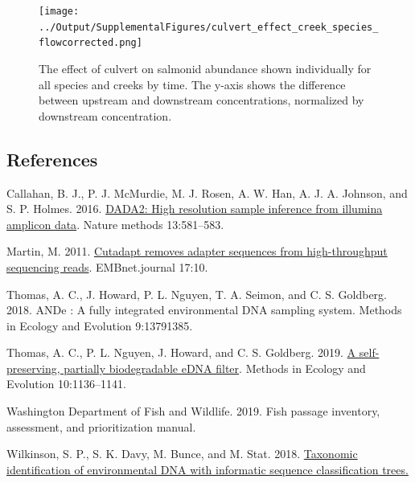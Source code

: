 \documentclass[
]{article}
\newlength{\cslhangindent}
\newlength{\cslentryspacingunit} %
\newenvironment{CSLReferences}[2] %
 {%
  \setlength{\parindent}{0pt}
  \ifodd #1
  \let\oldpar\par
  \def\par{\hangindent=\cslhangindent\oldpar}
  \fi
  \setlength{\parskip}{#2\cslentryspacingunit}
 }%
 {}
\begin{document}
\begin{figure}
\centering
\texttt{[image: ../Output/SupplementalFigures/culvert\_effect\_creek\_species\_flowcorrected.png]}
\caption{The effect of culvert on salmonid abundance shown individually
for all species and creeks by time. The y-axis shows the difference
between upstream and downstream concentrations, normalized by downstream
concentration.\label{fig:culvertsspeciescreek}}
\end{figure}

\hypertarget{references}{%
\subsection*{References}\label{references}}

\hypertarget{refs}{}
\begin{CSLReferences}{1}{0}
\leavevmode{}%
Callahan, B. J., P. J. McMurdie, M. J. Rosen, A. W. Han, A. J. A.
Johnson, and S. P. Holmes. 2016.
\href{https://doi.org/10.1038/nmeth.3869}{DADA2: High resolution sample
inference from illumina amplicon data}. Nature methods 13:581--583.

\leavevmode{}%
Martin, M. 2011. \href{https://doi.org/10.14806/ej.17.1.200}{Cutadapt
removes adapter sequences from high-throughput sequencing reads}.
EMBnet.journal 17:10.

\leavevmode{}%
Thomas, A. C., J. Howard, P. L. Nguyen, T. A. Seimon, and C. S.
Goldberg. 2018. ANDe {\texttrademark}: A fully integrated environmental
DNA sampling system. Methods in Ecology and Evolution 9:13791385.

\leavevmode{}%
Thomas, A. C., P. L. Nguyen, J. Howard, and C. S. Goldberg. 2019.
\href{https://doi.org/10.1111/2041-210X.13212}{A self-preserving,
partially biodegradable eDNA filter}. Methods in Ecology and Evolution
10:1136--1141.

\leavevmode{}%
Washington Department of Fish and Wildlife. 2019. Fish passage
inventory, assessment, and prioritization manual.

\leavevmode{}%
Wilkinson, S. P., S. K. Davy, M. Bunce, and M. Stat. 2018.
\href{https://doi.org/10.7287/peerj.preprints.26812v1}{Taxonomic
identification of environmental DNA with informatic sequence
classification trees.}

\end{CSLReferences}
\end{document}

